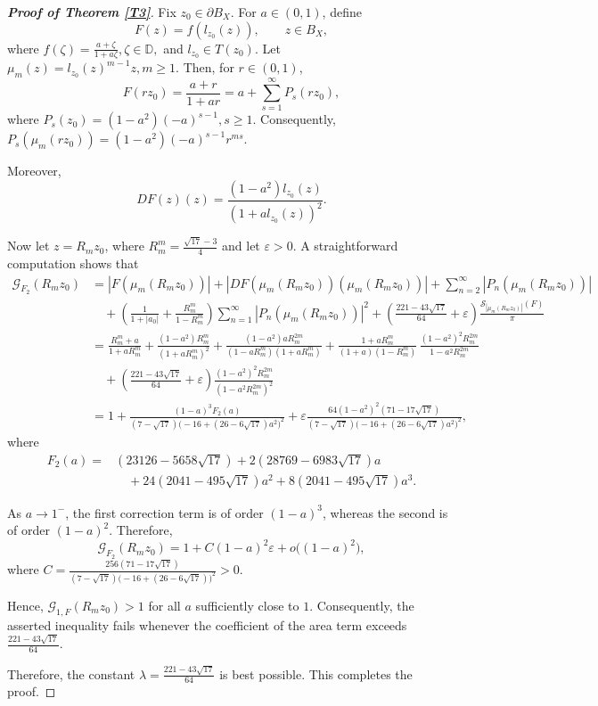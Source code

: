 \documentclass[11pt, reqno]{amsart}
\newtheorem*{cor A}{Corollary A}
\newtheorem*{cor B}{Corollary B}
\numberwithin{equation}{section}
\begin{document}
\begin{proof}[{\bf Proof of Theorem \ref{T3}}]
Fix \(z_0\in\partial B_X\). For \(a\in(0,1)\), define
\begin{equation}\label{F2}
F(z)=f(l_{z_0}(z)),\qquad z\in B_X,
\end{equation}
where $f(\zeta)=\frac{a+\zeta}{1+a\zeta},
\zeta\in\mathbb D,$
and \(l_{z_0}\in T(z_0)\). Let $\mu_m(z)=l_{z_0}(z)^{m-1}z, m\ge1.$
Then, for \(r\in(0,1)\),
\[
F(rz_0)=\frac{a+r}{1+ar}
      =a+\sum_{s=1}^{\infty}P_s(rz_0),
\]
where $P_s(z_0)=(1-a^2)(-a)^{s-1}, s\ge1.$ Consequently, $P_s(\mu_m(rz_0)) =(1-a^2)(-a)^{s-1}r^{ms}.$

Moreover,
\[
DF(z)(z)
=
\frac{(1-a^2)l_{z_0}(z)}
     {(1+al_{z_0}(z))^2}.
\]

Now let \(z=R_mz_0\), where $R_m^m=\frac{\sqrt{17}-3}{4}$ and let \(\varepsilon>0\). A straightforward computation shows that
\[
\begin{aligned}
\mathcal{G}_{F_2}(R_mz_0)
&=
|F(\mu_m(R_mz_0))|
+|DF(\mu_m(R_mz_0))(\mu_m(R_mz_0))|
+\sum_{n=2}^{\infty}|P_n(\mu_m(R_mz_0))|
\\
&\quad
+\left(\frac{1}{1+|a_0|}
+\frac{R_m^m}{1-R_m^m}\right)
\sum_{n=1}^{\infty}|P_n(\mu_m(R_mz_0))|^2
+\left(\frac{221-43\sqrt{17}}{64}
+\varepsilon\right)
\frac{\mathcal S_{|\mu_m(R_mz_0)|}(F)}{\pi}
\\
&=
\frac{R_m^m+a}{1+aR_m^m}
+\frac{(1-a^2)R_m^m}
       {(1+aR_m^m)^2}
+\frac{(1-a^2)aR_m^{2m}}
       {(1-aR_m^m)(1+aR_m^m)}
+\frac{1+aR_m^m}
       {(1+a)(1-R_m^m)}
\,\frac{(1-a^2)^2R_m^{2m}}
       {1-a^2R_m^{2m}}
\\
&\quad
+\left(\frac{221-43\sqrt{17}}{64}
+\varepsilon\right)
\frac{(1-a^2)^2R_m^{2m}}
     {(1-a^2R_m^{2m})^2}
\\
&=
1+
\frac{(1-a)^3F_2(a)}
     {(7-\sqrt{17})
      \bigl(-16+(26-6\sqrt{17})a^2\bigr)^2}
+\varepsilon
\frac{64(1-a^2)^2(71-17\sqrt{17})}
     {(7-\sqrt{17})
      \bigl(-16+(26-6\sqrt{17})a^2\bigr)^2},
\end{aligned}
\]
where
\[
\begin{aligned}
F_2(a)
={}&
(23126-5658\sqrt{17})
+2(28769-6983\sqrt{17})a
\\
&\quad
+24(2041-495\sqrt{17})a^2
+8(2041-495\sqrt{17})a^3.
\end{aligned}
\]

As \(a\to1^{-}\), the first correction term is of order \((1-a)^3\), whereas the second is of order \((1-a)^2\). Therefore,
\[
\mathcal{G}_{F_2}(R_mz_0)=1+C(1-a)^2\varepsilon
+o\bigl((1-a)^2\bigr),
\]
where $C=\frac{256(71-17\sqrt{17})}{(7-\sqrt{17})\bigl(-16+(26-6\sqrt{17})\bigr)^2}>0.$

Hence, $\mathcal{G}_{1,F}(R_mz_0)>1$  for all \(a\) sufficiently close to \(1\). Consequently, the asserted inequality fails whenever the coefficient of the area term exceeds $\frac{221-43\sqrt{17}}{64}.$

Therefore, the constant $\lambda=\frac{221-43\sqrt{17}}{64}$
is best possible. This completes the proof.

\end{proof}
\end{document}
